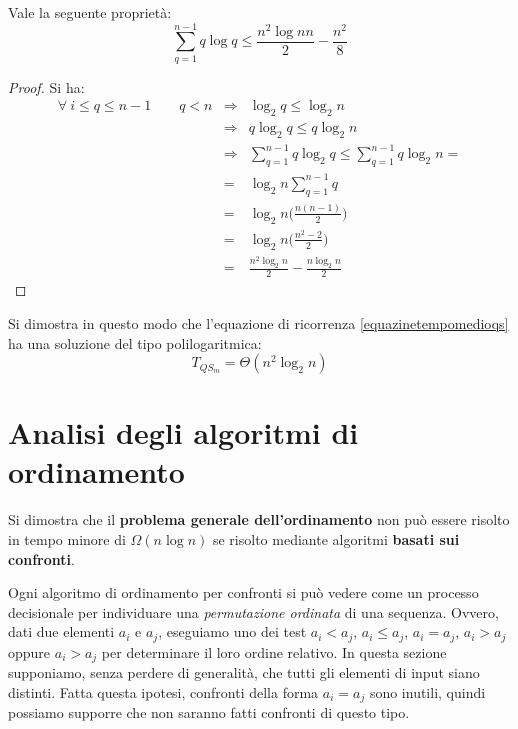 \begin{flushright}
	\blacksquare
\end{flushright}


\begin{propbox}
		Vale la seguente proprietà:
	\begin{equation}\label{approssimazionesommatorie}
		\sum_{q=1}^{n-1} q \log q \leq \frac{n^{2} \log n n}{2} - \frac{n^{2}}{8}
	\end{equation}
\end{propbox}


\begin{proof}
		Si ha:
	\begin{eqnarray*}
		\forall \ i \leq q \leq n-1 \qquad q<n &\Rightarrow  & \log_{2} q \leq \log_{2} n \\
		&\Rightarrow & q \log_{2} q \leq q \log_{2} n \\
		& \Rightarrow & \sum_{q=1}^{n-1} q\log_{2} q \leq \sum_{q=1}^{n-1} q \log_{2} n = \\
		&=& \log_{2} n \sum_{q=1}^{n-1} q \\
		&=& \log_{2} n \bigl( \frac{n(n-1)}{2}\bigr) \\
		&=& \log_{2} n \bigl( \frac{n^{2}-2}{2}\bigr)\\
		&=& \frac{n^{2}\log_{2}n}{2}- \frac{n\log_{2} n}{2}
	\end{eqnarray*}
\end{proof}

Si dimostra in questo modo che l'equazione di ricorrenza \ref{equazinetempomedioqs} ha una soluzione del tipo polilogaritmica:
\begin{equation}
	T_{QS_{m}}=\Theta(n^{2}\log_{2}n)
\end{equation}

\section{Analisi degli algoritmi di ordinamento}
Si dimostra che il \textbf{problema generale dell'ordinamento} non può essere risolto in tempo minore di $\Omega(n \log n)$ se risolto mediante algoritmi \textbf{basati sui confronti}.

Ogni algoritmo di ordinamento per confronti si può vedere come un processo decisionale per individuare una \textit{permutazione ordinata} di una sequenza. Ovvero, dati due elementi $a_{i}$ e $a_{j}$, eseguiamo uno dei test $a_{i}<a_{j}$, $ a_{i}\leq a_{j}$, $a_{i}=a_{j}$, $a_{i}>a_{j}$ oppure $a_{i}>a_{j}$ per determinare il loro ordine relativo. In questa sezione supponiamo, senza perdere di generalità, che tutti gli elementi di input siano distinti. Fatta questa ipotesi, confronti della forma $a_{i}=a_{j}$ sono inutili, quindi possiamo supporre che non saranno fatti confronti di questo tipo.

